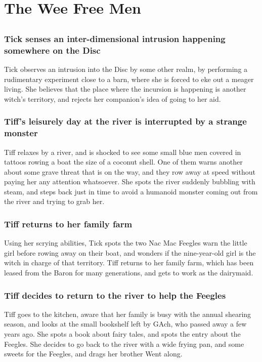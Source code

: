 \section{The Wee Free Men}


\subsection{}
\subsubsection{\Gls{Tick} senses an inter-dimensional intrusion happening somewhere on the Disc}
\Gls{Tick} observes an intrusion into the Disc by some other realm, by performing a rudimentary
experiment close to a barn, where she is forced to eke out a meager living. She believes that the
place where the incursion is happening is another witch's territory, and rejects her companion's
idea of going to her aid.

\subsubsection{\Gls{Tiff}'s leisurely day at the river is interrupted by a strange monster}
\Gls{Tiff} relaxes by a river, and is shocked to see some small blue men covered in tattoos rowing
a boat the size of a coconut shell. One of them warns another about some grave threat that is on the
way, and they row away at speed without paying her any attention whatsoever. She spots the river
suddenly bubbling with steam, and steps back just in time to avoid a humanoid monster coming out
from the river and trying to grab her.

\subsubsection{\Gls{Tiff} returns to her family farm}
Using her scrying abilities, \Gls{Tick} spots the two Nac Mac Feegles warn the little girl before
rowing away on their boat, and wonders if the nine-year-old girl is the witch in charge of that
territory. \Gls{Tiff} returns to her family farm, which has been leased from the \Gls{Baron} for
many generations, and gets to work as the dairymaid.

\subsubsection{\Gls{Tiff} decides to return to the river to help the Feegles}
\Gls{Tiff} goes to the kitchen, aware that her family is busy with the annual shearing season, and
looks at the small bookshelf left by \Gls{GAch}, who passed away a few years ago. She spots a book
about fairy tales, and spots the entry about the Feegles. She decides to go back to the river with
a wide frying pan, and some sweets for the Feegles, and drags her brother \Gls{Went} along.

